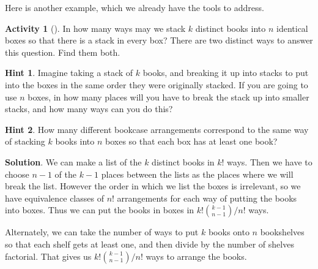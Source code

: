 \documentclass[10pt,]{book}
\theoremstyle{plain}
\theoremstyle{definition}
\theoremstyle{definition}
\theoremstyle{definition}
\newtheorem{activity}[project]{Activity}
\theoremstyle{definition}
\numberwithin{equation}{chapter}
\begin{document}
\par
\hypertarget{p-776}{}%
Here is another example, which we already have the tools to address.%
\begin{activity}[]\label{brokenpermutation}
\hypertarget{p-777}{}%
In how many ways may we stack \(k\) distinct books into \(n\) identical boxes so that there is a stack in every box? There are two distinct ways to answer this question.  Find them both.%
\par\smallskip%
\noindent\textbf{Hint 1}.\hypertarget{hint-65}{}\quad%
\hypertarget{p-778}{}%
Imagine taking a stack of \(k\) books, and breaking it up into stacks to put into the boxes in the same order they were originally stacked. If you are going to use \(n\) boxes, in how many places will you have to break the stack up into smaller stacks, and how many ways can you do this?%
\par\smallskip%
\noindent\textbf{Hint 2}.\hypertarget{hint-66}{}\quad%
\hypertarget{p-779}{}%
How many different bookcase arrangements correspond to the same way of stacking \(k\) books into \(n\) boxes so that each box has at least one book?%
\par\smallskip%
\noindent\textbf{Solution}.\hypertarget{solution-75}{}\quad%
\hypertarget{p-780}{}%
We can make a list of the \(k\) distinct books in \(k!\) ways. Then we have to choose \(n-1\) of the \(k-1\) places between the lists as the places where we will break the list. However the order in which we list the boxes is irrelevant, so we have equivalence classes of \(n!\) arrangements for each way of putting the books into boxes. Thus we can put the books in boxes in \(k!\binom{k-1}{n-1}/n!\) ways.%
\par
\hypertarget{p-781}{}%
Alternately, we can take the number of ways to put \(k\) books onto \(n\) bookshelves so that each shelf gets at least one, and then divide by the number of shelves factorial. That gives us \(k!\binom{k-1}{n-1}/n!\) ways to arrange the books.%
\end{activity}
\hypertarget{p-782}{}%
\end{document}
